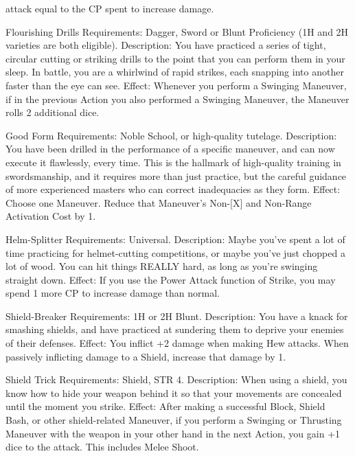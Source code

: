 \documentclass[oneside,11pt,english]{book}
\begin{document}
attack equal to the CP spent to increase damage. 

 

Flourishing Drills 
Requirements: Dagger, Sword or Blunt Proficiency (1H and 2H varieties are both eligible). 
Description: You have practiced a series of tight, circular cutting or striking drills to the point that you 
can perform them in your sleep. In battle, you are a whirlwind of rapid strikes, each snapping into another 
faster than the eye can see. 
Effect: Whenever you perform a Swinging Maneuver, if in the previous Action you also performed a 
Swinging Maneuver, the Maneuver rolls 2 additional dice. 

 

Good Form 
Requirements: Noble School, or high-quality tutelage. 
Description: You have been drilled in the performance of a specific maneuver, and can now execute it 
flawlessly, every time. This is the hallmark of high-quality training in swordsmanship, and it requires 
more than just practice, but the careful guidance of more experienced masters who can correct 
inadequacies as they form. 
Effect: Choose one Maneuver. Reduce that Maneuver’s Non-[X] and Non-Range Activation Cost by 1. 

 

Helm-Splitter 
Requirements: Universal. 
Description: Maybe you've spent a lot of time practicing for helmet-cutting competitions, or maybe 
you've just chopped a lot of wood. You can hit things REALLY hard, as long as you’re swinging straight 
down. 
Effect: If you use the Power Attack function of Strike, you may spend 1 more CP to increase damage 
than normal. 

 

Shield-Breaker 
Requirements: 1H or 2H Blunt. 
Description: You have a knack for smashing shields, and have practiced at sundering them to deprive 
your enemies of their defenses. 
Effect: You inflict +2 damage when making Hew attacks. When passively inflicting damage to a Shield, 
increase that damage by 1. 

 

Shield Trick 
Requirements: Shield, STR 4. 
Description: When using a shield, you know how to hide your weapon behind it so that your movements 
are concealed until the moment you strike. 
Effect: After making a successful Block, Shield Bash, or other shield-related Maneuver, if you perform a 
Swinging or Thrusting Maneuver with the weapon in your other hand in the next Action, you gain +1 dice 
to the attack. This includes Melee Shoot. 
\end{document}
